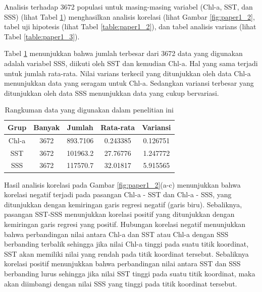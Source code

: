 \begin{spacing}{1.5}
	Analisis terhadap 3672 populasi untuk masing-masing variabel (Chl-a, SST, dan SSS) (lihat Tabel \ref{table:paper1_1}) menghasilkan analisis korelasi (lihat Gambar \ref{fig:paper1_2}, tabel uji hipotesis (lihat Tabel \ref{table:paper1_2}), dan tabel analisis varians (lihat Tabel \ref{table:paper1_3}).
	
	Tabel \ref{table:paper1_1} menunjukkan bahwa jumlah terbesar dari 3672 data yang digunakan adalah variabel SSS, diikuti oleh SST dan kemudian Chl-a. Hal yang sama terjadi untuk jumlah rata-rata. Nilai varians terkecil yang ditunjukkan oleh data Chl-a menunjukkan data yang seragam untuk Chl-a. Sedangkan variansi terbesar yang ditunjukkan oleh data SSS menunjukkan data yang cukup bervariasi.
	
	\begin{table}[H]
		\centering
		\caption{Rangkuman data yang digunakan dalam penelitian ini}
		\label{table:paper1_1}
		\begin{tabular}{|c|c|c|c|c|}
			\hline
			Grup  & Banyak & Jumlah   & Rata-rata & Variansi \\ \hline
			Chl-a & 3672   & 893.7106 & 0.243385  & 0.126751 \\ \hline
			SST   & 3672   & 101963.2 & 27.76776  & 1.247772 \\ \hline
			SSS   & 3672   & 117570.7 & 32.01817  & 5.915565 \\ \hline
		\end{tabular}
	\end{table}

	Hasil analisis korelasi pada Gambar \ref{fig:paper1_2}(a-c) menunjukkan bahwa korelasi negatif terjadi pada pasangan Chl-a - SST dan Chl-a - SSS, yang ditunjukkan dengan kemiringan garis regresi negatif (garis biru). Sebaliknya, pasangan SST-SSS menunjukkan korelasi positif yang ditunjukkan dengan kemiringan garis regresi yang positif. Hubungan korelasi negatif menunjukkan bahwa perbandingan nilai antara Chl-a dan SST atau Chl-a dengan SSS berbanding terbalik sehingga jika nilai Chl-a tinggi pada suatu titik koordinat, SST akan memiliki nilai yang rendah pada titik koordinat tersebut. Sebaliknya korelasi positif menunjukkan bahwa perbandingan nilai antara SST dan SSS berbanding lurus sehingga jika nilai SST tinggi pada suatu titik koordinat, maka akan diimbangi dengan nilai SSS yang tinggi pada titik koordinat tersebut.
	

\end{spacing}
